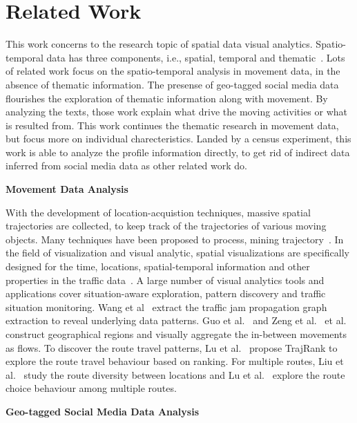 \section{Related Work}

This work concerns to the research topic of spatial data visual analytics. Spatio-temporal data has three components, i.e., spatial, temporal and thematic~\cite{andrienko2013visual}. Lots of related work focus on the spatio-temporal analysis in movement data, in the absence of thematic information. The presense of geo-tagged social media data flourishes the exploration of thematic information along with movement. By analyzing the texts, those work explain what drive the moving activities or what is resulted from. This work continues the thematic research in movement data, but focus more on individual charecteristics. Landed by a census experiment, this work is able to analyze the profile information directly, to get rid of indirect data inferred from social media data as other related work do.

\textbf{Movement Data Analysis} 
 
 With the development of location-acquistion techniques, massive spatial trajectories are collected, to keep track of the trajectories of various moving objects. Many techniques have been proposed to process, mining trajectory~\cite{Zheng2015_trajectory}. In the field of visualization and visual analytic, spatial visualizations are specifically designed for the time, locations, spatial-temporal information and other properties in the traffic data~\cite{chen2015survey}. A large number of visual analytics tools and applications cover situation-aware exploration, pattern discovery and traffic situation monitoring. Wang et al~\cite{wang2013visual} extract the traffic jam propagation graph extraction to reveal underlying data patterns. Guo et al.~\cite{guo2011tripvista} and Zeng et al.~\cite{zeng2013visualizing} et al. construct geographical regions and visually aggregate the in-between movements as flows. To discover the route travel patterns, Lu et al.~\cite{lu2015trajrank} propose TrajRank to explore the route travel behaviour based on ranking. For multiple routes, Liu et al.~\cite{liu2011_routediversity} study the route diversity between locations and Lu et al.~\cite{Lu2017_multipleroute} explore the route choice behaviour among multiple routes.


\textbf{Geo-tagged Social Media Data Analysis}

